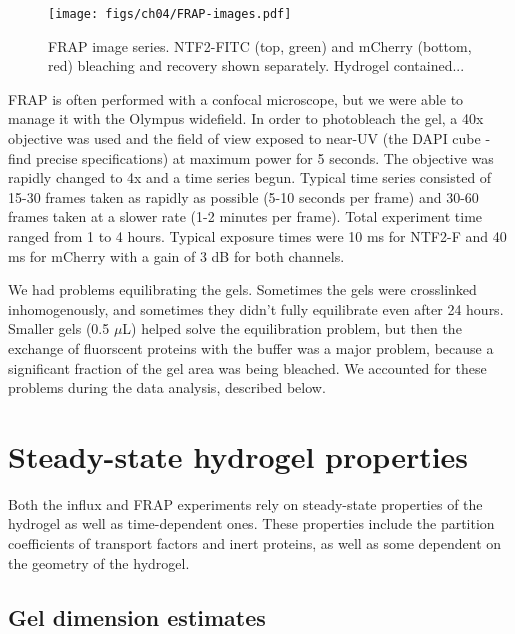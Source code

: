 \begin{figure} %

\caption{FRAP image series. NTF2-FITC (top, green) and mCherry (bottom, red) bleaching and recovery shown separately.  Hydrogel contained... }
\centering
\texttt{[image: figs/ch04/FRAP-images.pdf]}
\label{fig:frap-images}
\end{figure} 

FRAP is often performed with a confocal microscope, but we were able to manage it with the Olympus widefield.  In order to photobleach the gel, a 40x objective was used and the field of view exposed to near-UV (the DAPI cube - find precise specifications) at maximum power for 5 seconds.  The objective was rapidly changed to 4x and a time series begun.  Typical time series consisted of 15-30 frames taken as rapidly as possible (5-10 seconds per frame) and 30-60 frames taken at a slower rate (1-2 minutes per frame).  Total experiment time ranged from 1 to 4 hours.  Typical exposure times were 10 ms for NTF2-F and 40 ms for mCherry with a gain of 3 dB for both channels.

We had problems equilibrating the gels.  Sometimes the gels were crosslinked inhomogenously, and sometimes they didn't fully equilibrate even after 24 hours.  Smaller gels (0.5 $\mu$L) helped solve the equilibration problem, but then the exchange of fluorscent proteins with the buffer was a major problem, because a significant fraction of the gel area was being bleached.  We accounted for these problems during the data analysis, described below.

\section{Steady-state hydrogel properties}

Both the influx and FRAP experiments rely on steady-state properties of the hydrogel as well as time-dependent ones.  These properties include the partition coefficients of transport factors and inert proteins, as well as some dependent on the geometry of the hydrogel.

\subsection{Gel dimension estimates}

